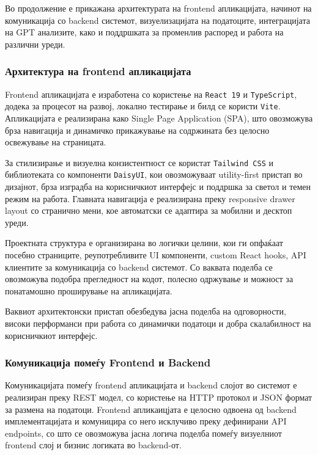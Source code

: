 Во продолжение е прикажана архитектурата на frontend апликацијата, начинот на комуникација со backend системот, визуелизацијата на податоците, интеграцијата на GPT анализите, како и поддршката за променлив распоред и работа на различни уреди.

\subsubsection{Архитектура на frontend апликацијата}

Frontend апликацијата е изработена со користење на \texttt{React 19} и \texttt{TypeScript}, додека за процесот на развој, локално тестирање и билд се користи \texttt{Vite}. Апликацијата е реализирана како Single Page Application (SPA), што овозможува брза навигација и динамичко прикажување на содржината без целосно освежување на страницата.

За стилизирање и визуелна конзистентност се користат \texttt{Tailwind CSS} и библиотеката со компоненти \texttt{DaisyUI}, кои овозможуваат utility-first пристап во дизајнот, брза изградба на корисничкиот интерфејс и поддршка за светол и темен режим на работа. Главната навигација е реализирана преку responsive drawer layout со странично мени, кое автоматски се адаптира за мобилни и десктоп уреди.

Проектната структура е организирана во логички целини, кои ги опфаќаат посебно страниците, реупотребливите UI компоненти, custom React hooks, API клиентите за комуникација со backend системот. Со ваквата поделба се овозможува подобра прегледност на кодот, полесно одржување и можност за понатамошно проширување на апликацијата.

Ваквиот архитектонски пристап обезбедува јасна поделба на одговорности, високи перформанси при работа со динамички податоци и добра скалабилност на корисничкиот интерфејс.

\subsubsection{Комуникација помеѓу Frontend и Backend}

Комуникацијата помеѓу frontend апликацијата и backend слојот во системот е реализиран преку REST модел, со користење на HTTP протокол и JSON формат за размена на податоци. Frontend апликаицјата е целосно одвоена од backend имплементацијата и комуницира со него исклучиво преку дефинирани API endpoints, со што се овозможува јасна логича поделба помеѓу визуелниот frontend слој и бизнис логиката во backend-от.

